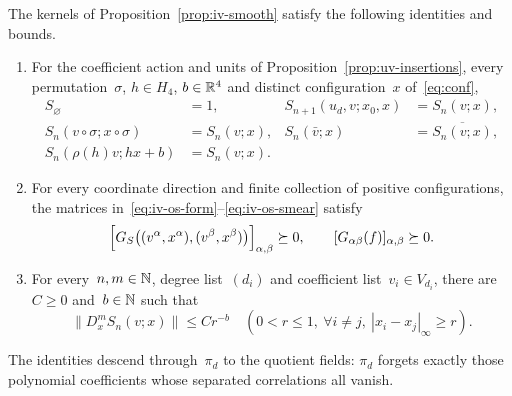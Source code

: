 \begin{proposition}\label{prop:iv-euclidean}
The kernels of Proposition~\ref{prop:iv-smooth} satisfy the following identities and bounds.
\begin{enumerate}[label=\textup{(\roman*)},ref=\theproposition(\roman*)]
\item\label{item:iv-symmetries} For the coefficient action and units of Proposition~\ref{prop:uv-insertions}, every permutation~$\sigma$, $h\in H_4$, $b\in\mathbb R^4$ and distinct configuration~$x$ of~\eqref{eq:conf},
\begin{equation}\label{eq:iv-symmetries}
\begin{aligned}
 S_\varnothing&=1,&
 S_{n+1}(u_d,v;x_0,x)&=S_n(v;x),\\
 S_n(v\circ\sigma;x\circ\sigma)&=S_n(v;x),&
 S_n(\bar v;x)&=\overline{S_n(v;x)},\\
 S_n(\rho(h)v;hx+b)&=S_n(v;x).
\end{aligned}
\end{equation}
\item\label{item:iv-reflection} For every coordinate direction and finite collection of positive configurations, the matrices in~\eqref{eq:iv-os-form}--\eqref{eq:iv-os-smear} satisfy
\begin{equation}\label{eq:iv-os-positive}
 \Bigl[G_S\bigl((v^\alpha,x^\alpha),(v^\beta,x^\beta)\bigr)\Bigr]_{\alpha,\beta}\succeq0,
 \qquad [G_{\alpha\beta}(f)]_{\alpha,\beta}\succeq0.
\end{equation}
\item\label{item:iv-power} For every~$n,m\in\mathbb N$, degree list~$(d_i)$ and coefficient list~$v_i\in V_{d_i}$, there are~$C\ge0$ and~$b\in\mathbb N$ such that
\begin{equation}\label{eq:iv-derivative-bound}
 \|D_x^m S_n(v;x)\|\le Cr^{-b}
 \quad\left(0<r\le1,\ \forall i\ne j,\ |x_i-x_j|_\infty\ge r\right).
\end{equation}
\end{enumerate}
The identities descend through~$\pi_d$ to the quotient fields: $\pi_d$ forgets exactly those polynomial coefficients whose separated correlations all vanish.
\end{proposition}

